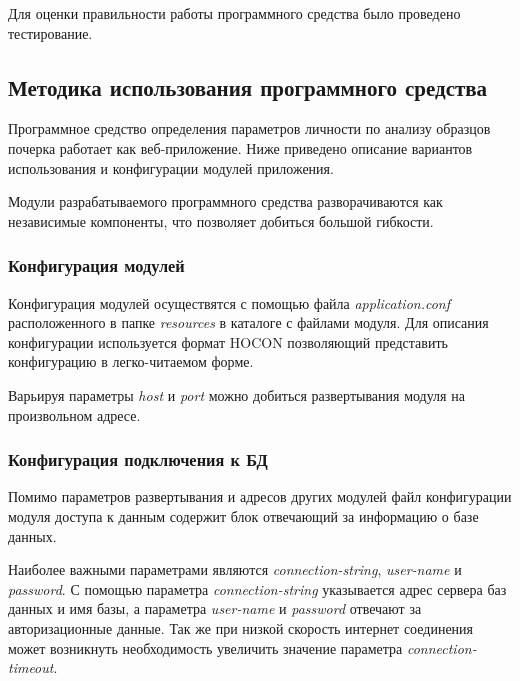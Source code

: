 Для оценки правильности работы программного средства было проведено тестирование.

\subsection{Методика использования программного средства}
\label{sec:manpage:admin_man}
Программное средство определения параметров личности по анализу образцов почерка работает как веб-приложение. Ниже приведено описание вариантов использования и конфигурации модулей приложения.

Модули разрабатываемого программного средства разворачиваются как независимые компоненты, что позволяет добиться большой гибкости.

\subsubsection{Конфигурация модулей}
Конфигурация модулей осуществятся с помощью файла \emph{application.conf} расположенного в папке \emph{resources} в каталоге с файлами модуля. Для описания конфигурации используется формат HOCON позволяющий представить конфигурацию в легко-читаемом форме. 



Варьируя параметры \emph{host} и \emph{port} можно добиться развертывания модуля на произвольном адресе.

\subsubsection{Конфигурация подключения к БД}
Помимо параметров развертывания и адресов других модулей файл конфигурации модуля доступа к данным содержит блок отвечающий за информацию о базе данных.



Наиболее важными параметрами являются \emph{connection-string}, \emph{user-name} и \emph{password}. С помощью параметра \emph{connection-string} указывается адрес сервера баз данных и имя базы, а параметра \emph{user-name} и \emph{password} отвечают за авторизационные данные. Так же при низкой скорость интернет соединения может возникнуть необходимость увеличить значение параметра \emph{connection-timeout}.

